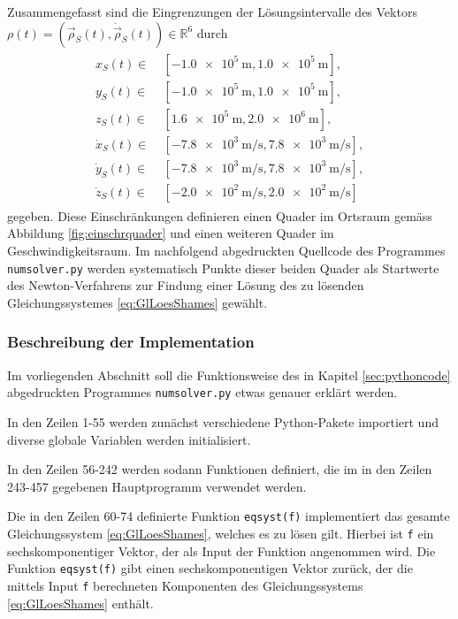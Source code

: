 \documentclass[a4paper,12pt]{article}
\numberwithin{equation}{section}
\begin{document}
Zusammengefasst sind die Eingrenzungen der Lösungsintervalle des Vektors $\rho(t) = (\vec{\rho}_S(t), \dot{\vec{\rho}}_S(t)) \in \mathbb{R}^6$ durch
\begin{align}\label{eq:einschrloesintervalle}
\begin{aligned}
x_S(t) \in&\; [-\SI{1.0e5}{\meter},\SI{1.0e5}{\meter}], \\
y_S(t) \in&\; [-\SI{1.0e5}{\meter},\SI{1.0e5}{\meter}], \\
z_S(t) \in&\; [\SI{1.6e5}{\meter},\SI{2.0e6}{\meter}], \\
\dot{x}_S(t) \in&\; [\SI{-7.8e3}{\meter\per\second},\SI{7.8e3}{\meter\per\second}] , \\
\dot{y}_S(t) \in&\; [\SI{-7.8e3}{\meter\per\second},\SI{7.8e3}{\meter\per\second}], \\
\dot{z}_S(t) \in&\; [\SI{-2.0e2}{\meter\per\second},\SI{2.0e2}{\meter\per\second}] 
\end{aligned}
\end{align} gegeben. Diese Einschränkungen definieren einen Quader im Ortsraum gemäss Abbildung \ref{fig:einschrquader} und einen weiteren Quader im Geschwindigkeitsraum. Im nachfolgend abgedruckten Quellcode des Programmes \verb|numsolver.py| werden systematisch Punkte dieser beiden Quader als Startwerte des Newton-Verfahrens zur Findung einer Lösung des zu lösenden Gleichungssystemes \eqref{eq:GlLoesShames} gewählt.

\subsubsection{Beschreibung der Implementation}\label{sec:implement}
Im vorliegenden Abschnitt soll die Funktionsweise des in Kapitel \ref{sec:pythoncode} abgedruckten Programmes \verb|numsolver.py| etwas genauer erklärt werden.

In den Zeilen 1-55 werden zunächst verschiedene Python-Pakete importiert und diverse globale Variablen werden initialisiert.

In den Zeilen 56-242 werden sodann Funktionen definiert, die im in den Zeilen 243-457 gegebenen Hauptprogramm verwendet werden.

Die in den Zeilen 60-74 definierte Funktion \verb|eqsyst(f)| implementiert das gesamte Gleichungssystem \eqref{eq:GlLoesShames}, welches es zu lösen gilt. Hierbei ist \verb|f| ein sechskomponentiger Vektor, der als Input der Funktion angenommen wird. Die Funktion \verb|eqsyst(f)| gibt einen sechskomponentigen Vektor zurück, der die mittels Input \verb|f| berechneten Komponenten des Gleichungssystems \eqref{eq:GlLoesShames} enthält.
\end{document}
